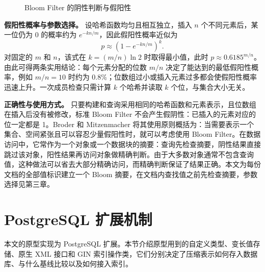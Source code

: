 \begin{figure}[htbp]
\centering
{}
\caption{Bloom Filter 的阴性判断与假阳性}
\label{fig:foundation-bloom}
\end{figure}

\textbf{假阳性概率与参数选择。} 设哈希函数均匀且相互独立，插入 $n$ 个不同元素后，某一位仍为 0 的概率约为 $e^{-kn/m}$，因此假阳性概率近似为
\[
p\approx\left(1-e^{-kn/m}\right)^k.
\]
对固定的 $m$ 和 $n$，该式在 $k=(m/n)\ln 2$ 时取得最小值，此时 $p\approx 0.6185^{m/n}$\cite{broder2004network}。由此可得两条实用结论：每个元素分配的位数 $m/n$ 决定了能达到的最低假阳性概率，例如 $m/n=10$ 时约为 0.8\%；位数组过小或插入元素过多都会使假阳性概率迅速上升。一次成员检查只需计算 $k$ 个哈希并读取 $k$ 个位，与集合大小无关。

\textbf{正确性与使用方式。} 只要构建和查询采用相同的哈希函数和元素表示，且位数组在插入后没有被修改，标准 Bloom Filter 不会产生假阴性：已插入的元素对应的位一定都是 1。Broder 和 Mitzenmacher 将其使用原则概括为：当需要表示一个集合、空间紧张且可以容忍少量假阳性时，就可以考虑使用 Bloom Filter\cite{broder2004network}。在数据访问中，它常作为一个对象或一个数据块的摘要：查询先检查摘要，阴性结果直接跳过该对象，阳性结果再访问对象做精确判断。由于大多数对象通常不包含查询值，这种做法可以省去大部分精确访问，而精确判断保证了结果正确。本文为每份文档的全部值标识建立一个 Bloom 摘要，在文档内查找值之前先检查摘要，参数选择见第三章。

\section{PostgreSQL 扩展机制}

本文的原型实现为 PostgreSQL 扩展。本节介绍原型用到的自定义类型、变长值存储、原生 XML 接口和 GIN 索引操作类，它们分别决定了压缩表示如何存入数据库、与什么基线比较以及如何接入索引。

